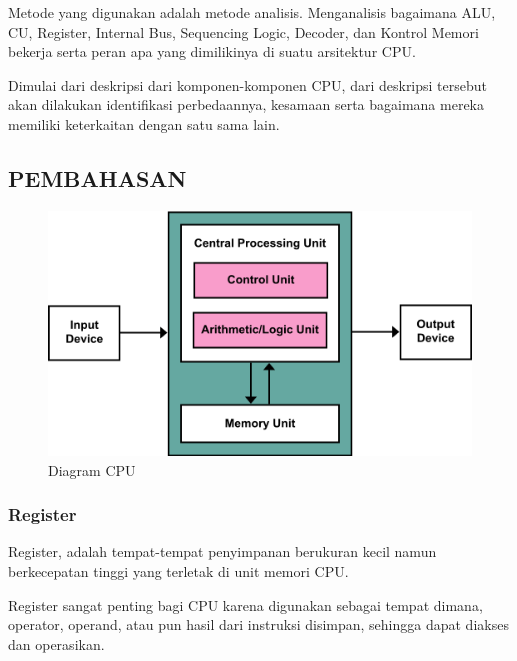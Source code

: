 \documentclass[12pt,a4paper]{article}
\begin{document}
    Metode yang digunakan adalah metode analisis. Menganalisis bagaimana
    ALU, CU, Register, Internal Bus, Sequencing Logic, Decoder, dan Kontrol Memori
    bekerja serta peran apa yang dimilikinya di suatu arsitektur CPU.

    Dimulai dari deskripsi dari komponen-komponen CPU, dari deskripsi tersebut
    akan dilakukan identifikasi perbedaannya, kesamaan serta bagaimana
    mereka memiliki keterkaitan dengan satu sama lain.

  \begin{center}
    \subsection*{\textbf{PEMBAHASAN}}
  \end{center}

  \vspace {0.25cm}

    \begin{figure}[h]
      \centering
      \includegraphics[scale=0.5]{CPUBASICDIAG}
      \caption{Diagram CPU}
      \label{fig:CPUBASICDIAG}
    \end{figure}

  \vspace {0.25cm}

    \subsubsection*{Register}

      Register, adalah tempat-tempat penyimpanan berukuran kecil namun
      berkecepatan tinggi yang terletak di unit memori CPU.

      Register sangat penting bagi CPU karena digunakan sebagai tempat dimana,
      operator, operand, atau pun hasil dari instruksi disimpan, sehingga
      dapat diakses dan operasikan.
\end{document}
